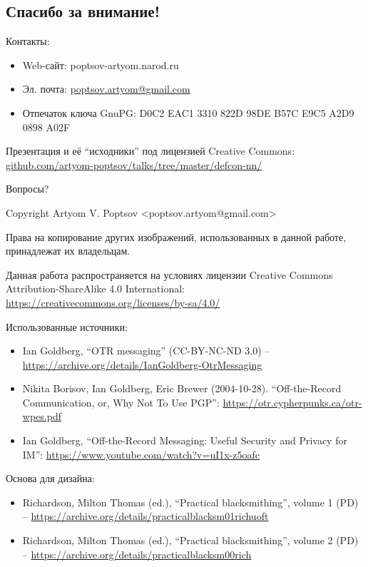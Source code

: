 \documentclass[presentation]{beamer}
\begin{document}


\subsection{Спасибо за внимание!}

\begin{frame}{}
  \large

  Контакты:
  \begin{itemize}
  \item Web-сайт: poptsov-artyom.narod.ru
  \item Эл. почта: \url{poptsov.artyom@gmail.com}
  \item Отпечаток ключа GnuPG: D0C2 EAC1 3310 822D 98DE  B57C E9C5 A2D9 0898 A02F
  \end{itemize}
  \medskip

  Презентация и её ``исходники'' под лицензией Creative Commons:
  \url{github.com/artyom-poptsov/talks/tree/master/defcon-nn/} \\[10pt]

  \bigskip

  \huge Вопросы?
\end{frame}

\begin{frame}{}
  Copyright  Artyom V. Poptsov
  <poptsov.artyom@gmail.com> \newline

  Права на копирование других изображений, использованных в данной
  работе, принадлежат их владельцам. \newline

  Данная работа распространяется на условиях лицензии Creative Commons
  Attribution-ShareAlike 4.0 International:
  \url{https://creativecommons.org/licenses/by-sa/4.0/}
\end{frame}

\begin{frame}{}
  Использованные источники:
  \begin{itemize}
  \item Ian Goldberg, ``OTR messaging'' (CC-BY-NC-ND 3.0) --
    \url{https://archive.org/details/IanGoldberg-OtrMessaging}
  \item Nikita Borisov, Ian Goldberg, Eric Brewer
    (2004-10-28). ``Off-the-Record Communication, or, Why Not To Use
    PGP'': \url{https://otr.cypherpunks.ca/otr-wpes.pdf}
  \item Ian Goldberg, ``Off-the-Record Messaging: Useful Security and
    Privacy for IM'': \url{https://www.youtube.com/watch?v=uI1x-z5oafc}
  \end{itemize}
  Основа для дизайна:
  \begin{itemize}
  \item Richardson, Milton Thomas (ed.), ``Practical blacksmithing'',
    volume 1 (PD) --
    \url{https://archive.org/details/practicalblacksm01richuoft}
  \item Richardson, Milton Thomas (ed.), ``Practical blacksmithing'',
    volume 2 (PD) --
    \url{https://archive.org/details/practicalblacksm00rich}
  \end{itemize}
\end{frame}


\end{document}
